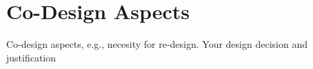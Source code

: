 \section{Co-Design Aspects}
\color{red}
Co-design	aspects,	e.g.,	necesity for	re-design.	Your	design	decision	and	justification
\color{black}

